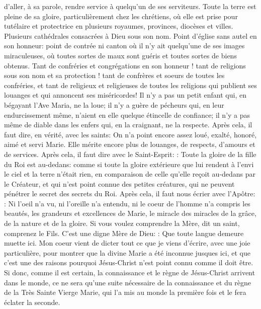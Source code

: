 d'aller, à sa parole, rendre service à quelqu'un de ses serviteurs.
 Toute la terre est pleine de sa gloire, particulièrement chez les chrétiens, où elle est prise pour tutélaire et
protectrice en plusieurs royaumes, provinces, diocèses et villes. Plusieurs cathédrales consacrées à Dieu sous son
nom. Point d'église sans autel en son honneur: point de contrée ni canton où il n'y ait quelqu'une de ses images
miraculeuses, où toutes sortes de maux sont guéris et toutes sortes de biens obtenus. Tant de confréries et
congrégations en son honneur ! tant de religions sous son nom et sa protection ! tant de confrères et soeurs de
toutes les confréries, et tant de religieux et religieuses de toutes les religions qui publient ses louanges et qui
annoncent ses miséricordes! Il n'y a pas un petit enfant qui, en bégayant l'Ave Maria, ne la loue; il n'y a guère de
pécheurs qui, en leur endurcissement même, n'aient en elle quelque étincelle de confiance; il n'y a pas même de
diable dans les enfers qui, en la craignant, ne la respecte.
 Après cela, il faut dire, en vérité, avec les saints:
On n'a point encore assez loué, exalté, honoré, aimé et servi Marie. Elle mérite encore plus de louanges, de
respects, d'amours et de services.
 Après cela, il faut dire avec le Saint-Esprit: : Toute la gloire de la fille du
Roi est au-dedans: comme si toute la gloire extérieure que lui rendent à l'envi le ciel et la terre n'était rien, en
comparaison de celle qu'elle reçoit au-dedans par le Créateur, et qui n'est point connue des petites créatures, qui
ne peuvent pénétrer le secret des secrets du Roi.
 Après cela, il faut nous écrier avec l'Apôtre: : Ni
l'oeil n'a vu, ni l'oreille n'a entendu, ni le coeur de l'homme n'a compris les beautés, les grandeurs et excellences
de Marie, le miracle des miracles de la grâce, de la nature et de la gloire. Si vous voulez comprendre la Mère, dit
un saint, comprenez le Fils. C'est une digne Mère de Dieu: : Que toute langue demeure
muette ici.
 Mon coeur vient de dicter tout ce que je viens d'écrire, avec une joie particulière, pour montrer que la divine
Marie a été inconnue jusques ici, et que c'est une des raisons pourquoi Jésus-Christ n'est point connu comme il
doit être. Si donc, comme il est certain, la connaissance et le règne de Jésus-Christ arrivent dans le monde, ce ne
sera qu'une suite nécessaire de la connaissance et du règne de la Très Sainte Vierge Marie, qui l'a mis au monde
la première fois et le fera éclater la seconde.

